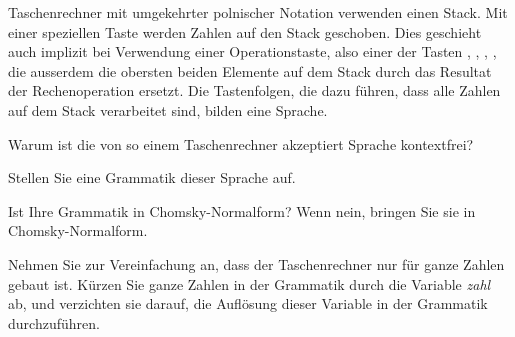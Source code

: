 Taschenrechner mit umgekehrter polnischer Notation verwenden einen Stack.
Mit einer speziellen Taste  werden Zahlen auf den Stack
geschoben. Dies geschieht auch implizit bei Verwendung einer
Operationstaste, also einer der Tasten \keys{{$+$}}, \keys{{$-$}},
\keys{{$\times$}}, \keys{{$\div$}}, die ausserdem die obersten
beiden Elemente auf dem Stack durch das Resultat der Rechenoperation 
ersetzt. Die Tastenfolgen, die dazu führen, dass alle Zahlen auf dem 
Stack verarbeitet sind, bilden eine Sprache.

\begin{teilaufgaben}
\item Warum ist die von so einem Taschenrechner akzeptiert Sprache
kontextfrei?
\item Stellen Sie eine Grammatik dieser Sprache auf.
\item Ist Ihre Grammatik in Chomsky-Normalform? Wenn nein, bringen Sie sie
in Chomsky-Normalform.
\end{teilaufgaben}

\begin{hinweis}
Nehmen Sie zur Vereinfachung an, dass der Taschenrechner nur für ganze
Zahlen gebaut ist. Kürzen Sie ganze Zahlen in der Grammatik durch
die Variable \textsl{zahl} ab, und verzichten sie darauf, die Auflösung
dieser Variable in der Grammatik durchzuführen.
\end{hinweis}


